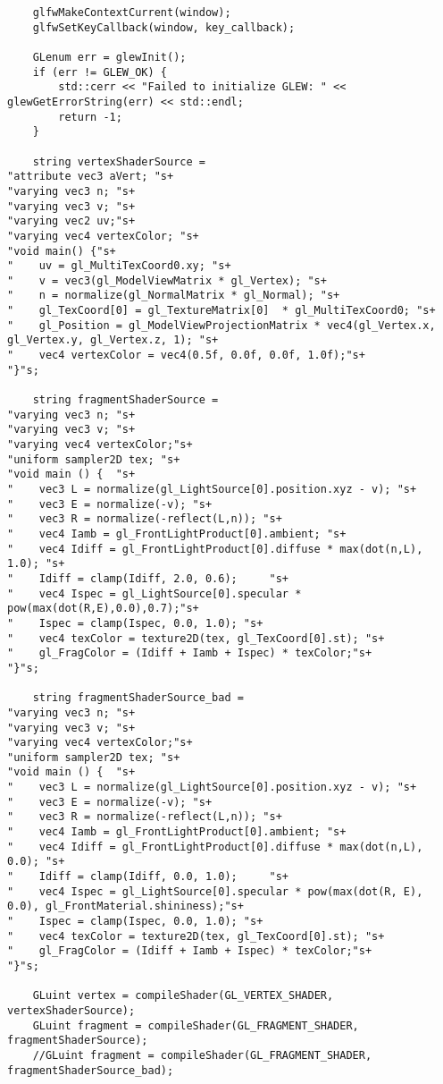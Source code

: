 \documentclass[a4paper, 14pt]{extarticle}
\begin{document}
\begin{verbatim}
    glfwMakeContextCurrent(window);
    glfwSetKeyCallback(window, key_callback);

    GLenum err = glewInit();
    if (err != GLEW_OK) {
        std::cerr << "Failed to initialize GLEW: " << glewGetErrorString(err) << std::endl;
        return -1;
    }
   
    string vertexShaderSource =
"attribute vec3 aVert; "s+
"varying vec3 n; "s+
"varying vec3 v; "s+
"varying vec2 uv;"s+
"varying vec4 vertexColor; "s+
"void main() {"s+
"    uv = gl_MultiTexCoord0.xy; "s+
"    v = vec3(gl_ModelViewMatrix * gl_Vertex); "s+
"    n = normalize(gl_NormalMatrix * gl_Normal); "s+
"    gl_TexCoord[0] = gl_TextureMatrix[0]  * gl_MultiTexCoord0; "s+
"    gl_Position = gl_ModelViewProjectionMatrix * vec4(gl_Vertex.x, gl_Vertex.y, gl_Vertex.z, 1); "s+
"    vec4 vertexColor = vec4(0.5f, 0.0f, 0.0f, 1.0f);"s+
"}"s;

    string fragmentShaderSource =
"varying vec3 n; "s+
"varying vec3 v; "s+
"varying vec4 vertexColor;"s+
"uniform sampler2D tex; "s+
"void main () {  "s+
"    vec3 L = normalize(gl_LightSource[0].position.xyz - v); "s+
"    vec3 E = normalize(-v); "s+
"    vec3 R = normalize(-reflect(L,n)); "s+
"    vec4 Iamb = gl_FrontLightProduct[0].ambient; "s+
"    vec4 Idiff = gl_FrontLightProduct[0].diffuse * max(dot(n,L), 1.0); "s+
"    Idiff = clamp(Idiff, 2.0, 0.6);     "s+
"    vec4 Ispec = gl_LightSource[0].specular * pow(max(dot(R,E),0.0),0.7);"s+
"    Ispec = clamp(Ispec, 0.0, 1.0); "s+
"    vec4 texColor = texture2D(tex, gl_TexCoord[0].st); "s+
"    gl_FragColor = (Idiff + Iamb + Ispec) * texColor;"s+
"}"s;

    string fragmentShaderSource_bad =
"varying vec3 n; "s+
"varying vec3 v; "s+
"varying vec4 vertexColor;"s+
"uniform sampler2D tex; "s+
"void main () {  "s+
"    vec3 L = normalize(gl_LightSource[0].position.xyz - v); "s+
"    vec3 E = normalize(-v); "s+
"    vec3 R = normalize(-reflect(L,n)); "s+
"    vec4 Iamb = gl_FrontLightProduct[0].ambient; "s+
"    vec4 Idiff = gl_FrontLightProduct[0].diffuse * max(dot(n,L), 0.0); "s+
"    Idiff = clamp(Idiff, 0.0, 1.0);     "s+
"    vec4 Ispec = gl_LightSource[0].specular * pow(max(dot(R, E), 0.0), gl_FrontMaterial.shininess);"s+
"    Ispec = clamp(Ispec, 0.0, 1.0); "s+
"    vec4 texColor = texture2D(tex, gl_TexCoord[0].st); "s+
"    gl_FragColor = (Idiff + Iamb + Ispec) * texColor;"s+
"}"s;

    GLuint vertex = compileShader(GL_VERTEX_SHADER, vertexShaderSource);
    GLuint fragment = compileShader(GL_FRAGMENT_SHADER, fragmentShaderSource);
    //GLuint fragment = compileShader(GL_FRAGMENT_SHADER, fragmentShaderSource_bad); 


\end{verbatim}
\end{document}
